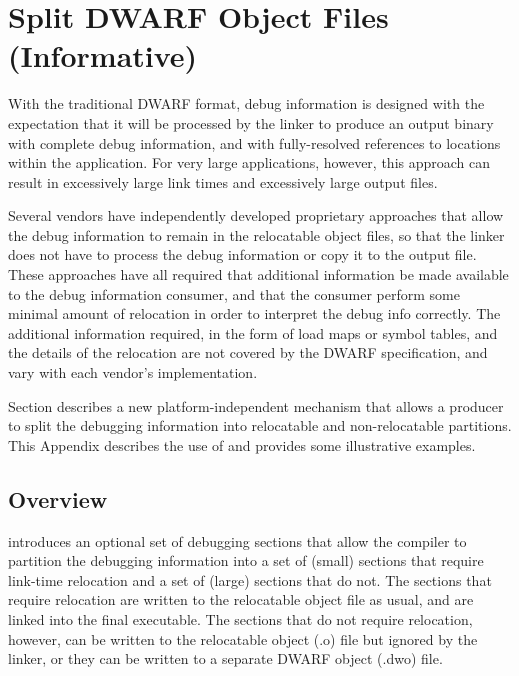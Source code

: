 \chapter[Split DWARF Object Files (Informative)]{Split DWARF Object Files (Informative)}
\label{app:splitdwarfobjectsinformative}
With the traditional DWARF format, debug information is designed
with the expectation that it will be processed by the linker to
produce an output binary with complete debug information, and
with fully-resolved references to locations within the
application. For very large applications, however, this approach
can result in excessively large link times and excessively large
output files. 

Several vendors have independently developed
proprietary approaches that allow the debug information to remain
in the relocatable object files, so that the linker does not have
to process the debug information or copy it to the output file.
These approaches have all required that additional information be
made available to the debug information consumer, and that the
consumer perform some minimal amount of relocation in order to
interpret the debug info correctly. The additional information
required, in the form of load maps or symbol tables, and the
details of the relocation are not covered by the DWARF
specification, and vary with each vendor's implementation.

Section  describes a new
platform-independent mechanism that allows a producer to
split the debugging information into relocatable and
non-relocatable partitions. This Appendix describes the use
of  and provides some illustrative
examples.

\section{Overview}
\label{app:splitoverview}
\DWARFVersionV{} introduces an optional set of debugging sections
that allow the compiler to partition the debugging information
into a set of (small) sections that require link-time relocation
and a set of (large) sections that do not. The sections that
require relocation are written to the relocatable object file as
usual, and are linked into the final executable. The sections
that do not require relocation, however, can be written to the
relocatable object (.o) file but ignored by the linker, or they
can be written to a separate DWARF object (.dwo{}) 
 file.

